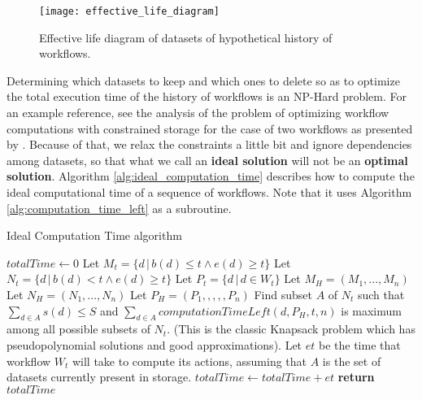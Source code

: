\begin{figure}
\centering
\texttt{[image: effective\_life\_diagram]}
\caption{Effective life diagram of datasets of hypothetical history of workflows.}
\label{fig:effective_life}
\end{figure}

Determining which datasets to keep and which ones to delete so as to optimize the total execution time of the history of workflows is an NP-Hard problem.  For an example reference, see the analysis of the problem of optimizing workflow computations with constrained storage for the case of two workflows as presented by \cite{bazzi}.  Because of that, we relax the constraints a little bit and ignore dependencies among datasets, so that what we call an \textbf{ideal solution} will not be an \textbf{optimal solution}.  Algorithm \ref{alg:ideal_computation_time} describes how to compute the ideal computational time of a sequence of workflows.  Note that it uses Algorithm \ref{alg:computation_time_left} as a subroutine.

\begin{algorithm}
\begin{singlespace}
\caption{Ideal Computation Time algorithm}
\label{alg:ideal_computation_time}
\begin{algorithmic}[1]
	\State $totalTime \gets 0$
		\State Let $M_t = \{ d\, |\, b(d) \leq t \wedge e(d) \geq t \}$
		\State Let $N_t = \{ d\, |\, b(d) < t \wedge e(d) \geq t \}$ 
		\State Let $P_t = \{ d\, |\, d \in W_t \}$ 
	\EndFor
	\State Let $M_H = (M_1, ..., M_n)$
	\State Let $N_H = (N_1, ..., N_n)$
	\State Let $P_H = (P_1, ,,,, P_n)$
		\State Find subset $A$ of $N_t$ such that $\sum_{d \in A}{s(d)} \leq S$ and $\sum_{d \in A}{computationTimeLeft(d, P_H, t, n)}$ is maximum among all possible subsets of $N_t$.  (This is the classic Knapsack problem which has pseudopolynomial solutions and good approximations).
		\State Let $et$ be the time that workflow $W_t$ will take to compute its actions, assuming that $A$ is the set of datasets currently present in storage.
		\State $totalTime \gets totalTime + et$
	\EndFor
	\State \textbf{return} $totalTime$
\EndProcedure
\end{algorithmic}
\end{singlespace}
\end{algorithm}

